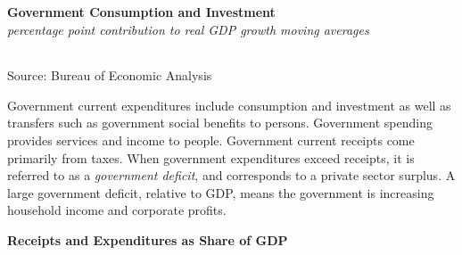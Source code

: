 \documentclass{report}
\begin{document}
{\begin{minipage}{0.76\textwidth}
\normalsize \textbf{Government Consumption and Investment}\\
\footnotesize{\textit{percentage point contribution to real GDP growth \hspace{37mm} moving averages}}\\ 
 \setlength{\tabcolsep}{3.1pt} \color{black!90}
	{\renewcommand{\arraystretch}{1.55}
		\begin{tabular}{p{42mm} R{6.7mm} R{6.7mm} R{6.7mm} R{6.7mm} R{6.7mm} 
		   R{7.8mm} R{6.7mm} R{6.7mm} }
			  \hline
		\end{tabular}}\vspace{-2mm}
		
\footnotesize{Source: Bureau of Economic Analysis}
\end{minipage}
\newpage
\begin{minipage}{0.76\textwidth}
\small Government current expenditures include consumption and investment as well as transfers such as government social benefits to persons. Government spending provides services and income to people. Government current receipts come primarily from taxes. When government expenditures exceed receipts, it is referred to as a \textit{government deficit}, and corresponds to a private sector surplus. A large government deficit, relative to GDP, means the government is increasing household income and corporate profits.

 

 
\vspace{1mm}

\textbf{Receipts and Expenditures as Share of GDP}


\end{minipage}}
\end{document}
